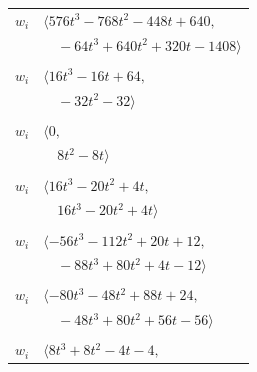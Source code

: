 \documentclass[11pt]{article}
\begin{document}
\begin{longtable}{@{}ll@{}}
$w_i$ & $\langle 576t^{3}-768t^{2}-448t+640,$\\
 & $\quad -64t^{3}+640t^{2}+320t-1408\rangle$\\
\addlinespace[2pt]
\multicolumn{2}{@{}p{0.97\textwidth}@{}}{$i=7$, $D_i=1$, $e_i=1$, $\rho_{ij}$: $11{:}3, \allowbreak 13{:}3, \allowbreak 14{:}1, \allowbreak 15{:}1, \allowbreak 23{:}2, \allowbreak 24{:}2, \allowbreak 36{:}2, \allowbreak 38{:}1, \allowbreak 46{:}1$}\\
$w_i$ & $\langle 16t^{3}-16t+64,$\\
 & $\quad -32t^{2}-32\rangle$\\
\addlinespace[2pt]
\multicolumn{2}{@{}p{0.97\textwidth}@{}}{$i=8$, $D_i=2$, $e_i=1$, $\rho_{ij}$: $13{:}2, \allowbreak 17{:}1, \allowbreak 23{:}1, \allowbreak 24{:}2, \allowbreak 31{:}1, \allowbreak 32{:}2, \allowbreak 43{:}1$}\\
$w_i$ & $\langle 0,$\\
 & $\quad 8t^{2}-8t\rangle$\\
\addlinespace[2pt]
\multicolumn{2}{@{}p{0.97\textwidth}@{}}{$i=9$, $D_i=2$, $\rho_{ij}$: $1{:}2, \allowbreak 11{:}2, \allowbreak 19{:}2, \allowbreak 29{:}2, \allowbreak 38{:}2$}\\
$w_i$ & $\langle 16t^{3}-20t^{2}+4t,$\\
 & $\quad 16t^{3}-20t^{2}+4t\rangle$\\
\addlinespace[2pt]
\multicolumn{2}{@{}p{0.97\textwidth}@{}}{$i=10$, $D_i=4$, $\rho_{ij}$: $1{:}2, \allowbreak 6{:}2, \allowbreak 11{:}2, \allowbreak 12{:}2, \allowbreak 24{:}2, \allowbreak 33{:}2, \allowbreak 46{:}2$}\\
$w_i$ & $\langle -56t^{3}-112t^{2}+20t+12,$\\
 & $\quad -88t^{3}+80t^{2}+4t-12\rangle$\\
\addlinespace[2pt]
\multicolumn{2}{@{}p{0.97\textwidth}@{}}{$i=11$, $D_i=2$, $e_i=1$, $\rho_{ij}$: $1{:}1, \allowbreak 7{:}1, \allowbreak 9{:}2, \allowbreak 10{:}2, \allowbreak 17{:}1, \allowbreak 18{:}1, \allowbreak 27{:}1, \allowbreak 28{:}2, \allowbreak 31{:}2, \allowbreak 44{:}3, \allowbreak 45{:}3$}\\
$w_i$ & $\langle -80t^{3}-48t^{2}+88t+24,$\\
 & $\quad -48t^{3}+80t^{2}+56t-56\rangle$\\
\addlinespace[2pt]
\multicolumn{2}{@{}p{0.97\textwidth}@{}}{$i=12$, $D_i=1$, $e_i=6$, $\rho_{ij}$: $1{:}2, \allowbreak 6{:}2, \allowbreak 10{:}2, \allowbreak 22{:}2, \allowbreak 23{:}2$}\\
$w_i$ & $\langle 8t^{3}+8t^{2}-4t-4,$\\

\end{longtable}
\end{document}
